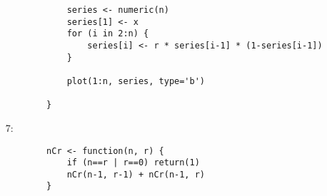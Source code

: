 \documentclass[11pt]{exam}
\begin{document}
\begin{questions}
\begin{enumerate}
\begin{verbatim}
		    series <- numeric(n)
		    series[1] <- x
		    for (i in 2:n) {
		        series[i] <- r * series[i-1] * (1-series[i-1])
		    }

		    plot(1:n, series, type='b')

		}
	\end{verbatim}
	
	\item[7:]
	
	\begin{verbatim}
		nCr <- function(n, r) {
		    if (n==r | r==0) return(1)
		    nCr(n-1, r-1) + nCr(n-1, r)
		}
	\end{verbatim} 
	
\end{enumerate}

\end{questions}
\end{document}
